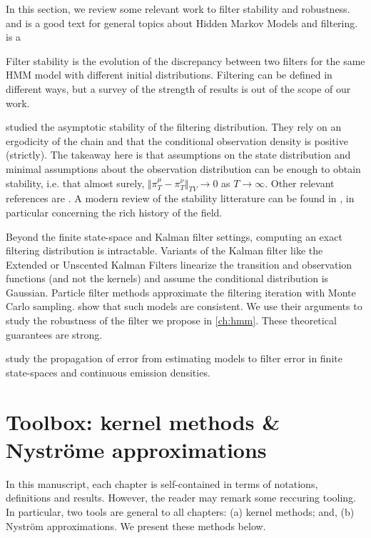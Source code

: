 In this section, we review some relevant work to filter stability and robustness.
\cite{cappehmm} and \cite{Saarka} is a good text for general topics about Hidden Markov Models and filtering. \cite{saarka} is a


Filter stability is the evolution of the discrepancy between two filters for the same HMM model with different initial distributions. Filtering can be defined in different ways, but a survey of the strength of results is out of the scope of our work.

\cite{ocone} studied the asymptotic stability of the filtering distribution. They rely on an ergodicity of the chain and that the conditional observation density is positive (strictly). The takeaway here is that assumptions on the state distribution and minimal assumptions about the observation distribution can be enough to obtain stability, i.e. that almost surely, $\Vert \pi_T^\mu - \pi^\nu_T\Vert_{TV} \to 0$ as $T\to\infty$. Other relevant references are \cite{atar,chigansky,mcdonald}.
A modern review of the stability litterature can be found in \cite{kimphd}, in particular concerning the rich history of the field.

Beyond the finite state-space and Kalman filter settings, computing an exact filtering distribution is intractable. Variants of the Kalman filter like the Extended or Unscented Kalman Filters linearize the transition and observation functions (and not the kernels) and assume the conditional distribution is Gaussian\cite{sarkka}. Particle filter methods approximate the filtering iteration with Monte Carlo sampling\cite{pf,smc}. \cite{oudjane,legland,} show that such models are consistent. We use their arguments to study the robustness of the filter we propose in \cref{ch:hmm}. These theoretical guarantees are strong.

\cite{castro,mitrophanov} study the propagation of error from estimating models to filter error in finite state-spaces and continuous emission densities.

\pagebreak
\section{Toolbox: kernel methods \& Nyströme approximations}\label{sec:tools}
In this manuscript, each chapter is self-contained in terms of notations, definitions and results. However, the reader may remark some reccuring tooling. In particular, two tools are general to all chapters: (a) kernel methods; and, (b) Nyström approximations. We present these methods below.

